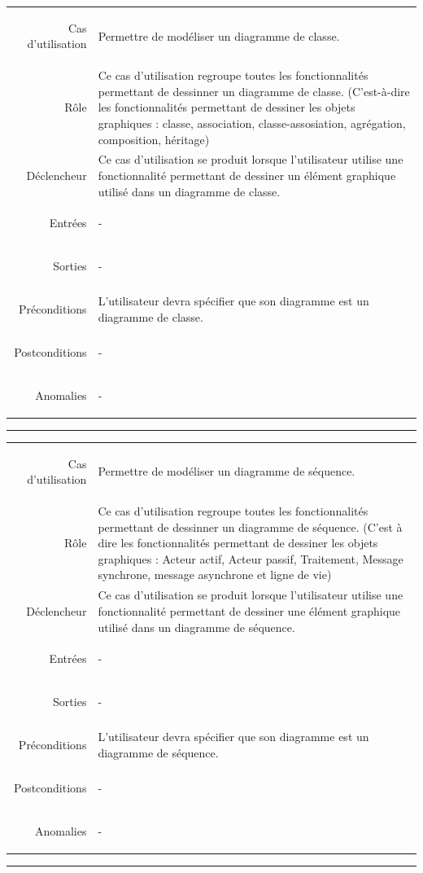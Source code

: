 \documentclass[12pt,a4paper,openany]{report}
\newcommand{\separateur}{\begin{center}\rule{12.6cm}{.5pt}\end{center}}
\begin{document}
	\begin{longtable}{>{\begin{bf}} r <{\end{bf}}!{:}p{13.5cm}}
	Cas d'utilisation & Permettre de modéliser un diagramme de classe.\\
	Rôle & Ce cas d'utilisation regroupe toutes les fonctionnalités permettant de dessinner un diagramme de classe.
	(C'est-à-dire les fonctionnalités permettant de dessiner les objets graphiques : classe, association, classe-assosiation,
	agrégation, composition, héritage) \\
	Déclencheur & Ce cas d'utilisation se produit lorsque l'utilisateur utilise une fonctionnalité permettant de dessiner un
	élément graphique utilisé dans un diagramme de classe.\\
	Entrées & -\\
	Sorties & -\\
	Préconditions & L'utilisateur devra spécifier que son diagramme est un diagramme de classe.\\
	Postconditions & -\\
	Anomalies & -\\
	\end{longtable}
		\separateur
	\begin{longtable}{>{\begin{bf}} r <{\end{bf}}!{:}p{13.5cm}}
	Cas d'utilisation & Permettre de modéliser un diagramme de séquence.\\
	Rôle & Ce cas d'utilisation regroupe toutes les fonctionnalités permettant de dessinner un diagramme de séquence.
	(C'est à dire les fonctionnalités permettant de dessiner les objets graphiques : Acteur actif, Acteur passif, Traitement,
	Message synchrone, message asynchrone et ligne de vie)\\
	Déclencheur & Ce cas d'utilisation se produit lorsque l'utilisateur utilise une fonctionnalité permettant de dessiner une élément
	graphique utilisé dans un diagramme de séquence.\\
	Entrées & -\\
	Sorties & -\\
	Préconditions & L'utilisateur devra spécifier que son diagramme est un diagramme de séquence. \\
	Postconditions & -\\
	Anomalies & -\\
	\end{longtable}
	\separateur
\end{document}
